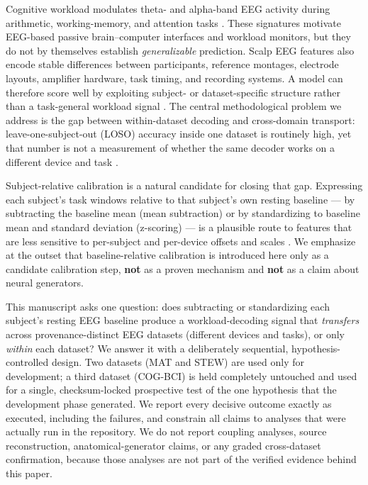 \documentclass[11pt]{article}
\begin{document}
Cognitive workload modulates theta- and alpha-band EEG activity during
arithmetic, working-memory, and attention tasks
\cite{klimesch1999, gevins1997, zyma2019}. These signatures motivate EEG-based
passive brain--computer interfaces and workload monitors, but they do not by
themselves establish \textit{generalizable} prediction. Scalp EEG features also
encode stable differences between participants, reference montages, electrode
layouts, amplifier hardware, task timing, and recording systems. A model can
therefore score well by exploiting subject- or dataset-specific structure
rather than a task-general workload signal \cite{lotte2018, jayaram2016}. The
central methodological problem we address is the gap between within-dataset
decoding and cross-domain transport: leave-one-subject-out (LOSO) accuracy
inside one dataset is routinely high, yet that number is not a measurement of
whether the same decoder works on a different device and task
\cite{zanini2018, congedo2017}.

Subject-relative calibration is a natural candidate for closing that gap.
Expressing each subject's task windows relative to that subject's own resting
baseline --- by subtracting the baseline mean (mean subtraction) or by
standardizing to baseline mean and standard deviation (z-scoring) --- is a
plausible route to features that are less sensitive to per-subject and
per-device offsets and scales \cite{vidaurre2011}. We emphasize at the outset
that baseline-relative calibration is introduced here only as a candidate
calibration step, \textbf{not} as a proven mechanism and \textbf{not} as a
claim about neural generators.

This manuscript asks one question: does subtracting or standardizing each
subject's resting EEG baseline produce a workload-decoding signal that
\textit{transfers} across provenance-distinct EEG datasets (different devices
and tasks), or only \textit{within} each dataset? We answer it with a
deliberately sequential, hypothesis-controlled design. Two datasets (MAT and
STEW) are used only for development; a third dataset (COG-BCI) is held
completely untouched and used for a single, checksum-locked prospective test of
the one hypothesis that the development phase generated. We report every
decisive outcome exactly as executed, including the failures, and constrain all
claims to analyses that were actually run in the repository. We do not report
coupling analyses, source reconstruction, anatomical-generator claims, or any
graded cross-dataset confirmation, because those analyses are not part of the
verified evidence behind this paper.
\end{document}
